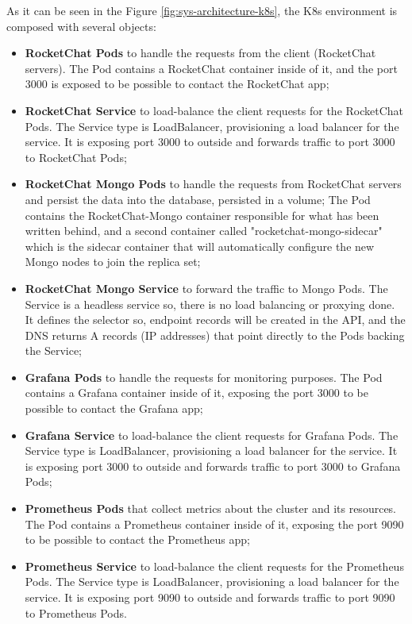 \documentclass[12pt,a4paper,oneside]{report}
\begin{document}
As it can be seen in the Figure \ref{fig:sys-architecture-k8s}, the \ac{K8s} environment is composed with several objects:
\begin{itemize}
    \item \textbf{RocketChat Pods} to handle the requests from the client (RocketChat servers). The Pod contains a RocketChat container inside of it, and the port 3000 is exposed to be possible to contact the RocketChat app;
    \item \textbf{RocketChat Service} to load-balance the client requests for the RocketChat Pods. The Service type is LoadBalancer, provisioning a load balancer for the service. It is exposing port 3000 to outside and forwards traffic to port 3000 to RocketChat Pods;
    \item \textbf{RocketChat Mongo Pods} to handle the requests from RocketChat servers and persist the data into the database, persisted in a volume; The Pod contains the RocketChat-Mongo container responsible for what has been written behind, and a second container called "rocketchat-mongo-sidecar" which is the sidecar container that will automatically configure the new Mongo nodes to join the replica set;
    \item \textbf{RocketChat Mongo Service} to forward the traffic to Mongo Pods. The Service is a headless service so, there is no load balancing or proxying done. It defines the selector so, endpoint records will be created in the API, and the \ac{DNS} returns A records (IP addresses) that point directly to the Pods backing the Service;
    \item \textbf{Grafana Pods} to handle the requests for monitoring purposes. The Pod contains a Grafana container inside of it, exposing the port 3000 to be possible to contact the Grafana app;
    \item \textbf{Grafana Service} to load-balance the client requests for Grafana Pods. The Service type is LoadBalancer, provisioning a load balancer for the service. It is exposing port 3000 to outside and forwards traffic to port 3000 to Grafana Pods;
    \item \textbf{Prometheus Pods} that collect metrics about the cluster and its resources. The Pod contains a Prometheus container inside of it, exposing the port 9090 to be possible to contact the Prometheus app;
    \item \textbf{Prometheus Service} to load-balance the client requests for the Prometheus Pods. The Service type is LoadBalancer, provisioning a load balancer for the service. It is exposing port 9090 to outside and forwards traffic to port 9090 to Prometheus Pods.
\end{itemize}
\end{document}
